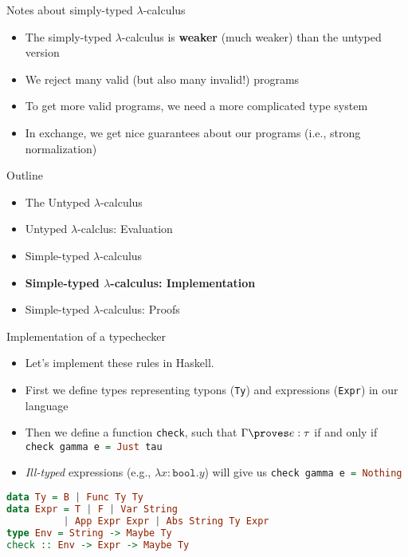 \documentclass[leqno,presentation,usenames,dvipsnames]{beamer}
\begin{document}
\begin{frame}{Notes about simply-typed $\lambda$-calculus}
    \begin{itemize}
        \item The simply-typed $\lambda$-calculus is \textbf{weaker} (much weaker) than the untyped version
        \item We reject many valid (but also many invalid!) programs
        \item To get more valid programs, we need a more complicated type system
        \item In exchange, we get nice guarantees about our programs (i.e., strong normalization)
    \end{itemize}
\end{frame}

\begin{frame}{Outline}
    \begin{itemize}
        \item The Untyped $\lambda$-calculus
        \item Untyped $\lambda$-calclus: Evaluation
        \item Simple-typed $\lambda$-calculus
        \item \textbf{Simple-typed $\lambda$-calculus: Implementation}
        \item Simple-typed $\lambda$-calculus: Proofs
    \end{itemize}
\end{frame}

\begin{frame}[fragile]{Implementation of a typechecker}
    \begin{itemize}
        \item Let's implement these rules in Haskell.
        \item First we define types representing typons (\texttt{Ty}) and expressions (\texttt{Expr}) in our language
        \item Then we define a function \texttt{check}, such that $\Gamma \proves e : \tau$ if and only if \lstinline[language=haskell, basicstyle=\small\ttfamily]{check gamma e = Just tau}
        \item \emph{Ill-typed} expressions (e.g., $\lambda x : \texttt{bool} . y$) will give us \lstinline[language=haskell, basicstyle=\small\ttfamily]{check gamma e = Nothing}
    \end{itemize}
\begin{lstlisting}[language=haskell, basicstyle=\small\ttfamily]
data Ty = B | Func Ty Ty
data Expr = T | F | Var String
          | App Expr Expr | Abs String Ty Expr
type Env = String -> Maybe Ty
check :: Env -> Expr -> Maybe Ty
\end{lstlisting}
\end{frame}
\end{document}
